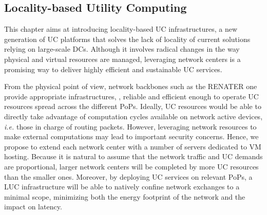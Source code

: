 \subsection{Locality-based Utility Computing}



This chapter aims at introducing locality-based UC infrastructures, a new
generation of UC platforms that solves the lack of locality of current
solutions relying on large-scale DCs. Although it involves radical changes in
the way physical and virtual resources are managed,  leveraging network centers
is a promising way to deliver highly efficient and sustainable UC services. 

From the physical point of view, network backbones such as the RENATER one provide
appropriate infrastructures, \ie, reliable and efficient enough to operate UC
resources spread across the different PoPs. Ideally, UC resources would be able to
directly
take advantage of computation cycles available on network active devices, \textit{i.e.} those
in charge of routing packets. However, leveraging network resources to make external
computations may lead to important security concerns. Hence, we propose to extend each
network center with a number of servers dedicated to VM hosting.
Because it is
natural to assume that the network traffic and UC demands are proportional, larger network
centers will be completed by more UC resources than the smaller ones. Moreover, by deploying
UC services on relevant PoPs, a LUC infrastructure will be able to natively confine
network exchanges to a minimal scope, minimizing both the energy footprint of the network
and the impact on latency.

